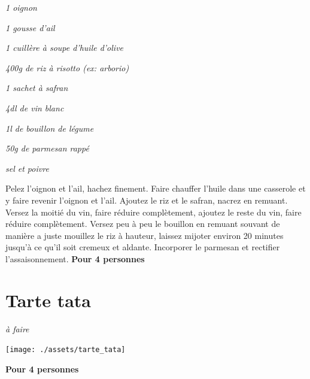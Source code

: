 \documentclass[10pt,a4paper]{report}
\begin{document}
    \begin{multicols}{2}
        \parbox[1cm]{\textwidth}{
            \begin{description}
                \item
                \textit{1 oignon}
                \item
                \textit{1 gousse d'ail}
                \item
                \textit{1 cuillère à soupe d'huile d'olive}
                \item
                \textit{400g de riz à risotto (ex: arborio)}
                \item
                \textit{1 sachet à safran}
                \item
                \textit{4dl de vin blanc}
                \item
                \textit{1l de bouillon de légume}
                \item
                \textit{50g de parmesan rappé}
                \item
                \textit{sel et poivre}
            \end{description}
        }
        \columnbreak
        \newline
        Pelez l'oignon et l'ail, hachez finement.
        \newline
        Faire chauffer l'huile dans une casserole et y faire revenir l'oignon et l'ail. Ajoutez le riz et le safran, nacrez en remuant. Versez la moitié du vin, faire réduire complètement, ajoutez le reste du vin, faire réduire complètement. Versez peu à peu le bouillon en remuant souvant de manière a juste mouillez le riz à hauteur, laissez mijoter environ 20 minutes jusqu'à ce qu'il soit cremeux et aldante.
        \newline
        Incorporer le parmesan et rectifier l'assaisonnement.
        \newline
        \newline
        \textbf{Pour 4 personnes}
    \end{multicols}
    \newpage

    \section{Tarte tata}

    \begin{multicols}{2}
        \parbox[1cm]{\textwidth}{
            \begin{description}
                \item \textit{à faire}
            \end{description}
        }
        \columnbreak
        \newline
        \centerline{\texttt{[image: ./assets/tarte\_tata]}}
        \newline
        \newline
        \textbf{Pour 4 personnes}
    \end{multicols}
    \newpage
\end{document}
